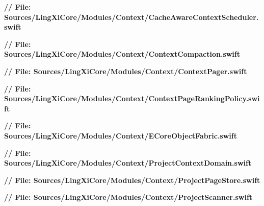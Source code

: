 \documentclass[10pt,a4paper]{article}
\newcommand{\repoRoot}{../../../}
\begin{document}
\noindent\textbf{// File: Sources/LingXiCore/Modules/Context/CacheAwareContextScheduler.swift}\par\vspace{2pt}

\vspace{8pt}

\noindent\textbf{// File: Sources/LingXiCore/Modules/Context/ContextCompaction.swift}\par\vspace{2pt}

\vspace{8pt}

\noindent\textbf{// File: Sources/LingXiCore/Modules/Context/ContextPager.swift}\par\vspace{2pt}

\vspace{8pt}

\noindent\textbf{// File: Sources/LingXiCore/Modules/Context/ContextPageRankingPolicy.swift}\par\vspace{2pt}

\vspace{8pt}

\noindent\textbf{// File: Sources/LingXiCore/Modules/Context/ECoreObjectFabric.swift}\par\vspace{2pt}

\vspace{8pt}

\noindent\textbf{// File: Sources/LingXiCore/Modules/Context/ProjectContextDomain.swift}\par\vspace{2pt}

\vspace{8pt}

\noindent\textbf{// File: Sources/LingXiCore/Modules/Context/ProjectPageStore.swift}\par\vspace{2pt}

\vspace{8pt}

\noindent\textbf{// File: Sources/LingXiCore/Modules/Context/ProjectScanner.swift}\par\vspace{2pt}

\vspace{8pt}
\end{document}
